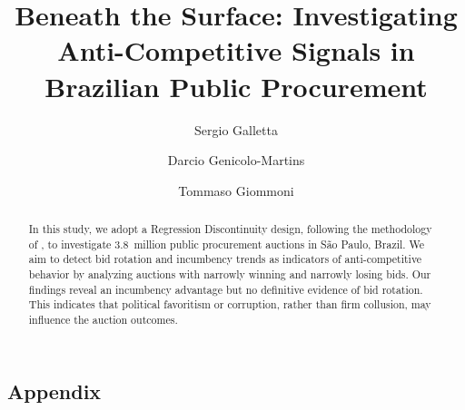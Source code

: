 \documentclass[12 pt]{elsarticle}
\begin{document}
\begin{frontmatter}
\title{\textbf{Beneath the Surface: Investigating Anti-Competitive Signals in Brazilian Public Procurement}}
\author[ETH]{Sergio Galletta}
\author[INSPER]{Darcio Genicolo-Martins}
\author[ETH]{Tommaso Giommoni}
\address[ETH]{ETH Zürich}
\address[INSPER]{INSPER}

\begin{abstract}
In this study, we adopt a Regression Discontinuity design, following the methodology of \cite{kawai2023using}, to investigate 3.8~million public procurement auctions in São Paulo, Brazil. We aim to detect bid rotation and incumbency trends as indicators of anti-competitive behavior by analyzing auctions with narrowly winning and narrowly losing bids. Our findings reveal an incumbency advantage but no definitive evidence of bid rotation. This indicates that political favoritism or corruption, rather than firm collusion, may influence the auction outcomes.
\end{abstract}
\end{frontmatter}

\bigskip
\clearpage









\clearpage
\newpage


\newpage

\begin{subappendices}
\setcounter{table}{0} 
\setcounter{section}{0}
\setcounter{equation}{0} 
\setcounter{figure}{0} 
\renewcommand{\thetable}{\Alph{section}.\arabic{table}}
\renewcommand{\thesection}{\Alph{section}}
\renewcommand{\thesubsection}{\Alph{section}.\arabic{subsection}}
\renewcommand{\thefigure}{\Alph{section}.\arabic{figure}}

\clearpage

\section{Appendix}\label{ApA}

\end{subappendices}
\end{document}
